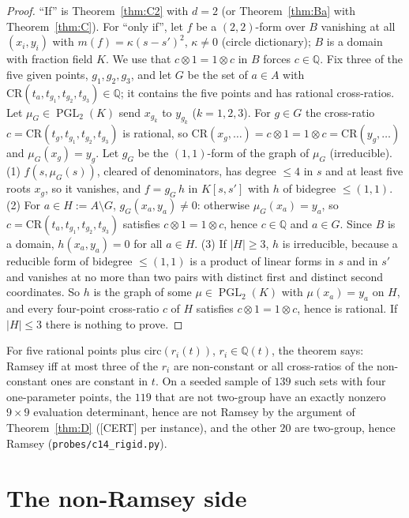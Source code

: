 \documentclass[11pt]{amsart}
\newcommand{\st}[1]{\textsf{[#1]}}
\newcommand{\Q}{\mathbb{Q}}
\DeclareMathOperator{\PGL}{PGL}
\theoremstyle{plain}
\theoremstyle{definition}
\begin{document}
\begin{proof}
``If'' is Theorem~\ref{thm:C2} with $d=2$ (or Theorem~\ref{thm:Ba} with Theorem~\ref{thm:C}). For ``only
if'', let $f$ be a $(2,2)$-form over $B$ vanishing at all $(x_i,y_i)$ with $m(f)=\kappa(s-s')^2$,
$\kappa\ne0$ (circle dictionary); $B$ is a domain with fraction field $K$. We use that $c\otimes1=1\otimes c$
in $B$ forces $c\in\Q$. Fix three of the five given points, $g_1,g_2,g_3$, and let $G$ be the set of
$a\in A$ with $\mathrm{CR}(t_a,t_{g_1},t_{g_2},t_{g_3})\in\Q$; it contains the five points and has rational
cross-ratios. Let $\mu_G\in\PGL_2(K)$ send $x_{g_k}$ to $y_{g_k}$ ($k=1,2,3$). For $g\in G$ the cross-ratio
$c=\mathrm{CR}(t_g,t_{g_1},t_{g_2},t_{g_3})$ is rational, so $\mathrm{CR}(x_g,\dots)=c\otimes1=1\otimes c=\mathrm{CR}(y_g,\dots)$ and
$\mu_G(x_g)=y_g$. Let $g_G$ be the $(1,1)$-form of the graph of $\mu_G$ (irreducible).
(1) $f(s,\mu_G(s))$, cleared of denominators, has degree $\le4$ in $s$ and at least five roots $x_g$, so it
vanishes, and $f=g_G\,h$ in $K[s,s']$ with $h$ of bidegree $\le(1,1)$.
(2) For $a\in H:=A\setminus G$, $g_G(x_a,y_a)\neq0$: otherwise $\mu_G(x_a)=y_a$, so
$c=\mathrm{CR}(t_a,t_{g_1},t_{g_2},t_{g_3})$ satisfies $c\otimes1=1\otimes c$, hence $c\in\Q$ and $a\in G$. Since
$B$ is a domain, $h(x_a,y_a)=0$ for all $a\in H$.
(3) If $|H|\ge3$, $h$ is irreducible, because a reducible form of bidegree $\le(1,1)$ is a product of linear
forms in $s$ and in $s'$ and vanishes at no more than two pairs with distinct first and distinct second
coordinates. So $h$ is the graph of some $\mu\in\PGL_2(K)$ with $\mu(x_a)=y_a$ on $H$, and every four-point
cross-ratio $c$ of $H$ satisfies $c\otimes1=1\otimes c$, hence is rational. If $|H|\le3$ there is nothing to
prove.
\end{proof}

\noindent For five rational points plus $\mathrm{circ}(r_i(t))$, $r_i\in\Q(t)$, the theorem says: Ramsey iff at
most three of the $r_i$ are non-constant or all cross-ratios of the non-constant ones are constant in $t$.
On a seeded sample of $139$ such sets with four one-parameter points, the $119$ that are not two-group have
an exactly nonzero $9\times9$ evaluation determinant, hence are not Ramsey by the argument of
Theorem~\ref{thm:D} (\st{CERT} per instance), and the other $20$ are two-group, hence Ramsey
(\texttt{probes/c14\_rigid.py}).

\section{The non-Ramsey side}\label{sec:nonramsey}
\end{document}
